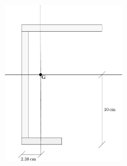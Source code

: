\renewcommand{\thefigure}{1.1~-~2}
\begin{figure}[h]
\centering
\includegraphics[width=0.45\textwidth]{Immagini/Parte_1/Esercizio1_1/Esercizio1_1_2.pdf}
\caption{}
\label{Esercizio1_1_2}
\end{figure}
